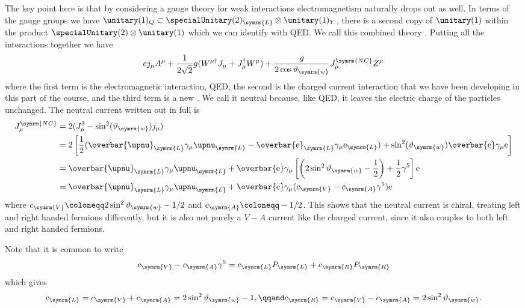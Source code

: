 \documentclass[fleqn]{NotesClass}
\newcommand{\Pparticle}[1]{\mathrm{#1}}
\newcommand{\Pex}{\ensuremath{\Pparticle{e}}}
\newcommand{\Pnu}{\ensuremath{\upnu}}
\newcommand{\diracadjoint}[1]{\overbar{#1}}
\newcommand{\hermit}{\dagger}
\newcommand{\Left}{\symrm{L}}
\newcommand{\Right}{\symrm{R}}
\newcommand{\weinbergangle}{\vartheta_{\symrm{w}}}
\newcommand{\neutralCurrent}{\symrm{NC}}
\newcommand{\cV}{c_{\symrm{V}}}
\newcommand{\cA}{c_{\symrm{A}}}
\newcommand{\cL}{c_{\Left}}
\newcommand{\cR}{c_{\Right}}
\begin{document}
    The key point here is that by considering a gauge theory for weak interactions electromagnetism naturally drops out as well.
    In terms of the gauge groups we have \(\unitary(1)_Q \subset \specialUnitary(2)_{\Left} \otimes \unitary(1)_{Y}\), there is a second copy of \(\unitary(1)\) within the product \(\specialUnitary(2) \otimes \unitary(1)\) which we can identify with QED.
    We call this combined theory .
    Putting all the interactions together we have
    \begin{equation}
        ej_\mu A^\mu + \frac{1}{2\sqrt{2}}g(W^{\mu\hermit}J_\mu + J_\mu^\hermit W^\mu) + \frac{g}{2\cos\weinbergangle} J^{\neutralCurrent}_\mu Z^\mu
    \end{equation}
    where the first term is the electromagnetic interaction, QED, the second is the charged current interaction that we have been developing in this part of the course, and the third term is a new .
    We call it neutral because, like QED, it leaves the electric charge of the particles unchanged.
    The neutral current written out in full is
    \begin{align}
        J^{\neutralCurrent}_{\mu} &= 2(J^3_\mu - \sin^2(\weinbergangle)j_\mu)\\
        &= 2\left[ \frac{1}{2}(\diracadjoint{\Pnu}_{\Left} \gamma_\mu \Pnu_{\Left} - \diracadjoint{\Pex}_{\Left} \gamma_\mu \Pex_{\Left}) + \sin^2(\weinbergangle) \diracadjoint{\Pex}\gamma_\mu \Pex \right]\\
        &= \diracadjoint{\Pnu}_{\Left} \gamma_\mu \Pnu_{\Left} + \diracadjoint{\Pex} \gamma_\mu \left[ \left( 2\sin^2\weinbergangle - \frac{1}{2} \right) + \frac{1}{2}\gamma^5 \right]\Pex\\
        &= \diracadjoint{\Pnu}_{\Left}\gamma_\mu\Pnu_{\Left} + \diracadjoint{\Pex}\gamma_\mu(\cV - \cA\gamma^5)\Pex
    \end{align}
    where \(\cV \coloneqq 2\sin^2\weinbergangle - 1/2\) and \(\cA \coloneqq -1/2\).
    This shows that the neutral current is chiral, treating left and right handed fermions differently, but it is also not purely a \(V - A\) current like the charged current, since it also couples to both left and right handed fermions.
    
    Note that it is common to write
    \begin{equation}
        \cV - \cA \gamma^5 = \cL P_{\Left} + \cR P_{\Right}
    \end{equation}
    which gives
    \begin{equation}
        \cL = \cV + \cA = 2\sin^2\weinbergangle - 1, \qqand \cR = \cV - \cA = 2\sin^2\weinbergangle.
    \end{equation}
    
\end{document}
